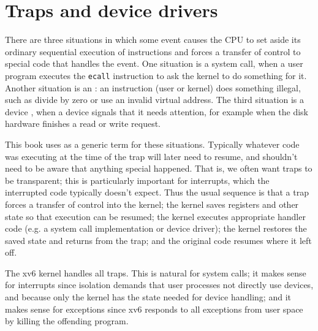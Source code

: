 \chapter{Traps and device drivers}
\label{CH:TRAP}

There are three situations in which some event causes the CPU to set
aside its ordinary sequential execution of instructions and forces a
transfer of control to special code that handles the event. One
situation is a system call, when a user program 
executes the {\tt ecall} instruction to ask the kernel to do 
something for it. Another situation is an :
an instruction (user or kernel) does something illegal, such as divide
by zero or use an invalid virtual address. The third situation is a
device , when a device signals that it needs
attention, for example when the disk hardware finishes a read or write
request.

This book uses  as a generic term for these
situations. Typically whatever code was executing at the time of the
trap will later need to resume, and shouldn't need to be aware that
anything special happened. That is, we often want traps to be
transparent; this is particularly important for interrupts, which the
interrupted code typically doesn't expect. Thus the usual sequence is that
a trap forces a transfer of control into the kernel; the kernel saves
registers and other state so that execution can be resumed; the kernel
executes appropriate handler code (e.g. a system call implementation
or device driver); the kernel restores the saved state and returns
from the trap; and the original code resumes where it left off.


The xv6 kernel handles all traps. This is natural for system calls; it
makes sense for interrupts since isolation demands that user processes
not directly use devices, and because only the kernel has the state
needed for device handling; and it makes sense for exceptions since
xv6 responds to all exceptions from user space by killing the
offending program.

